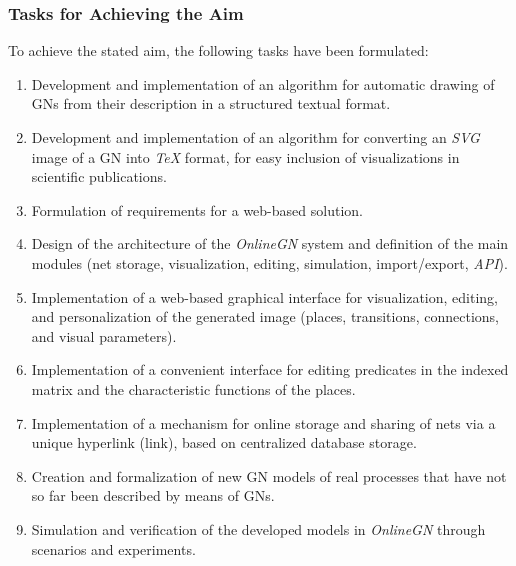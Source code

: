\subsubsection{Tasks for Achieving the Aim}
\hspace*{2.5em}To achieve the stated aim, the following tasks have been formulated:

\vspace{-0.2cm}

\begin{enumerate}[
	label=\textbf{Task \arabic*.},
	ref=Task \arabic*,            
	leftmargin=2.5em,
	labelsep=0.8em,
	align=left
	]
	\item Development and implementation of an algorithm for automatic drawing of GNs from their description in a structured textual format.
	\label{task:auto-draw}
	
	\item Development and implementation of an algorithm for converting an \textit{SVG} image of a GN into \textit{TeX} format, for easy inclusion of visualizations in scientific publications.
	\label{task:svg-to-tex}
	
	\item Formulation of requirements for a web-based solution.
	\label{task:requirements}
	
	\item Design of the architecture of the \textit{OnlineGN} system and definition of the main modules (net storage, visualization, editing, simulation, import/export, \textit{API}).
	\label{task:architecture}
	
	\item Implementation of a web-based graphical interface for visualization, editing, and personalization of the generated image (places, transitions, connections, and visual parameters).
	\label{task:web-ui}
	
	\item Implementation of a convenient interface for editing predicates in the indexed matrix and the characteristic functions of the places.
	\label{task:predicates-ui}
	
	\item Implementation of a mechanism for online storage and sharing of nets via a unique hyperlink (link), based on centralized database storage.
	\label{task:share-storage}
	
	\item Creation and formalization of new GN models of real processes that have not so far been described by means of GNs.
	\label{task:new-models}
	
	\item Simulation and verification of the developed models in \textit{OnlineGN} through scenarios and experiments.
	\label{task:simulation}
\end{enumerate}


